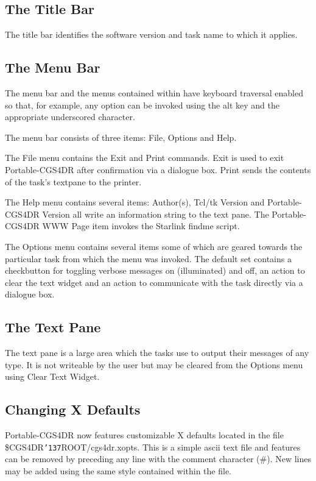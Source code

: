 \documentclass[a4paper]{book}
\renewcommand{\_}{{\tt\char'137}}
\begin{document}
\subsection{The Title Bar}
The title bar identifies the software version and task name to which it applies.

\subsection{The Menu Bar}
The menu bar and the menus contained within have keyboard traversal enabled so that, for example, any option
can be invoked using the {\sc alt} key and the appropriate underscored character.

The menu bar consists of three items: {\sf File}, {\sf Options} and {\sf Help}. 

The {\sf File} menu contains the {\sf Exit} and {\sf Print} commands. {\sf Exit} is used to exit Portable-CGS4DR after confirmation
via a dialogue box. {\sf Print} sends the contents of the task's textpane to the printer.

The {\sf Help} menu contains several items: {\sf Author(s)}, {\sf Tcl/tk Version} and {\sf Portable-CGS4DR Version} 
all write an information string to the text pane. The {\sf Portable-CGS4DR WWW Page} item invokes the Starlink findme script.

The {\sf Options} menu contains several items some of which are geared towards the particular task from
which the menu was invoked. The default set contains a checkbutton for toggling verbose messages on (illuminated)
and off, an action to clear the text widget and an action to communicate with the task directly via a dialogue box.

\subsection{The Text Pane}
The text pane is a large area which the tasks use to output their
messages of any type. It is not writeable by the user but may be
cleared from the {\sf Options} menu using {\sf Clear Text Widget}.

\subsection{Changing X Defaults}
Portable-CGS4DR now features customizable X defaults located in the file \$CGS4DR\_ROOT/cgs4dr.xopts.
This is a simple {\sc ascii} text file and features can be removed by preceding any line with the
comment character (\#). New lines may be added using the same style contained within the file.
\end{document}
